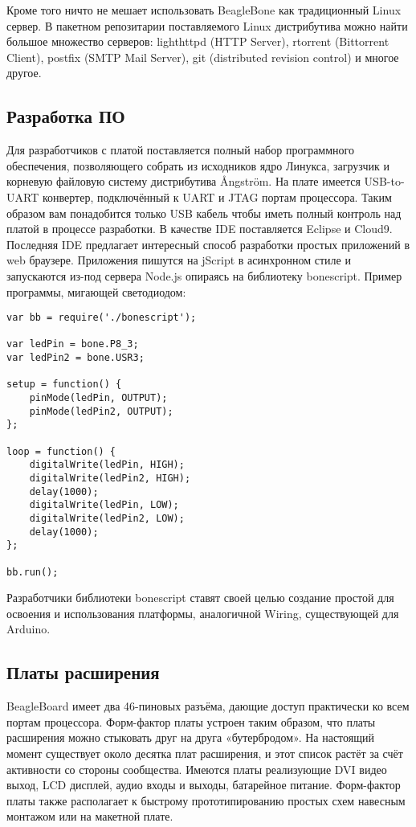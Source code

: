 \documentclass[10pt, a5paper]{article}
\begin{document}
Кроме того ничто не мешает использовать BeagleBone как традиционный Linux сервер. В пакетном репозитарии поставляемого Linux дистрибутива можно найти большое множество серверов: lighthttpd (HTTP Server), rtorrent (Bittorrent Client), postfix (SMTP Mail Server), git (distributed revision control) и многое другое.

\subsection*{Разработка ПО}

Для разработчиков с платой поставляется полный набор программного обеспечения, позволяющего собрать из исходников ядро Линукса, загрузчик и корневую файловую систему дистрибутива \AA{}ngstr\"{o}m. На плате имеется USB-to-UART конвертер, подключённый к UART и JTAG портам процессора. Таким образом вам понадобится только USB кабель чтобы иметь полный контроль над платой в процессе разработки.
В качестве IDE поставляется Eclipse и Cloud9. Последняя IDE предлагает интересный способ разработки простых приложений в web браузере. Приложения пишутся на jScript в асинхронном стиле и запускаются из-под сервера Node.js опираясь на библиотеку bonescript. Пример программы, мигающей светодиодом:

\begin{verbatim}
var bb = require('./bonescript');

var ledPin = bone.P8_3;
var ledPin2 = bone.USR3;

setup = function() {
    pinMode(ledPin, OUTPUT);
    pinMode(ledPin2, OUTPUT);
};

loop = function() {
    digitalWrite(ledPin, HIGH);
    digitalWrite(ledPin2, HIGH);
    delay(1000);
    digitalWrite(ledPin, LOW);
    digitalWrite(ledPin2, LOW);
    delay(1000);
};

bb.run();
\end{verbatim}

Разработчики библиотеки bonescript ставят своей целью создание простой для освоения и использования платформы, аналогичной Wiring, существующей для Arduino.

\subsection*{Платы расширения}

BeagleBoard имеет два 46-пиновых разъёма, дающие доступ практически ко всем портам процессора. Форм-фактор платы устроен таким образом, что платы расширения можно стыковать друг на друга «бутербродом». На настоящий момент существует около десятка плат расширения, и этот список растёт за счёт активности со стороны сообщества. Имеются платы реализующие DVI видео выход, LCD дисплей, аудио входы и выходы, батарейное питание. Форм-фактор платы также располагает к быстрому прототипированию простых схем навесным монтажом или на макетной плате.
\end{document}
